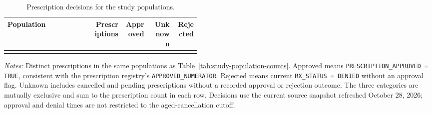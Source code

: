 \begin{table}[htbp]
\centering
\caption{Prescription decisions for the study populations.}
\label{tab:study-population-prescription-decisions}
\small
\begin{tabular}{@{}>{\raggedright\arraybackslash}p{0.45\linewidth}rrrr@{}}
\toprule
Population & Prescriptions & Approved & Unknown & Rejected \\
\midrule
{{ table_rows }}
\bottomrule
\end{tabular}

\begin{minipage}{\linewidth}
\footnotesize
\textit{Notes:} Distinct prescriptions in the same populations as
Table~\ref{tab:study-population-counts}. Approved means
\texttt{PRESCRIPTION\_APPROVED = TRUE}, consistent with the prescription registry's
\texttt{APPROVED\_NUMERATOR}. Rejected means current \texttt{RX\_STATUS = DENIED}
without an approval flag. Unknown includes cancelled and pending prescriptions
without a recorded approval or rejection outcome. The three categories are
mutually exclusive and sum to the prescription count in each row.
Decisions use the current source snapshot refreshed October 28, 2026;
approval and denial times are not restricted to the aged-cancellation cutoff.
\end{minipage}
\end{table}
